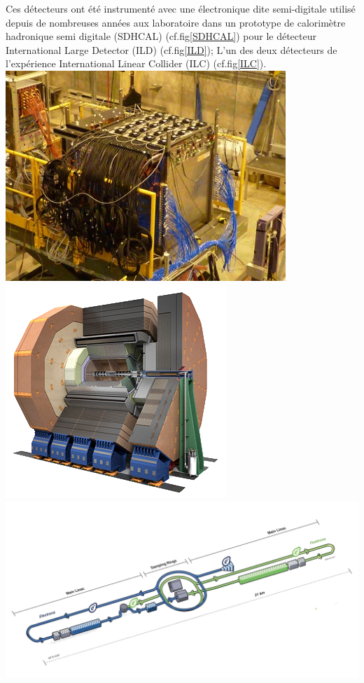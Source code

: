 Ces détecteurs ont été instrumenté avec une électronique dite semi-digitale utilisé depuis de nombreuses années aux laboratoire dans un prototype de calorimètre hadronique semi digitale (SDHCAL) (cf.fig\ref{SDHCAL}) \cite{Buridon:2016ill} pour le détecteur International Large Detector (ILD) (cf.fig\ref{ILD}); L'un des deux détecteurs de l'expérience International Linear Collider (ILC) (cf.fig\ref{ILC}).
\marginpar
{
	\centering
	\includegraphics[width=\marginparwidth]{GLA/SDHCAL.jpg}
	\label{SDHCAL}
}
\marginpar
{
	\centering
	\includegraphics[width=\marginparwidth]{GLA/ILD.png}
	\label{ILD}
}
\marginpar
{
	\centering
	\includegraphics[width=\marginparwidth]{GLA/ILC.png}
	\label{ILC}
}